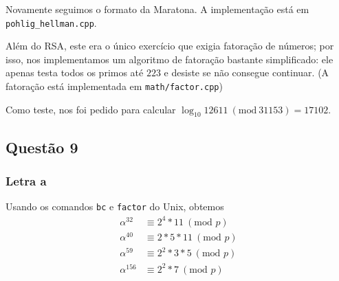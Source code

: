 \documentclass{article}
\renewcommand{\mod}[1]{ \ (\textrm{mod } #1) }
\begin{document}
Novamente seguimos o formato da Maratona.
A implementação está em \verb"pohlig_hellman.cpp".

Além do RSA, este era o único exercício que exigia fatoração de números;
por isso, nos implementamos um algoritmo de fatoração bastante simplificado:
ele apenas testa todos os primos até $223$ e desiste se não consegue continuar.
(A fatoração está implementada em \verb"math/factor.cpp")

Como teste, nos foi pedido para calcular $\log_{10} 12611\ (\mathrm{mod}\ 31153) = 17102$.

\subsection{Questão 9}

\subsubsection{Letra a}

Usando os comandos \verb"bc" e \verb"factor" do Unix, obtemos
\begin{align*}
    \alpha^{32} &\equiv 2^4 * 11 \mod{p} \\
    \alpha^{40} &\equiv 2*5*11 \mod{p} \\
    \alpha^{59} &\equiv 2^2*3*5 \mod{p} \\
    \alpha^{156} &\equiv 2^2*7 \mod{p}
\end{align*}
\end{document}
